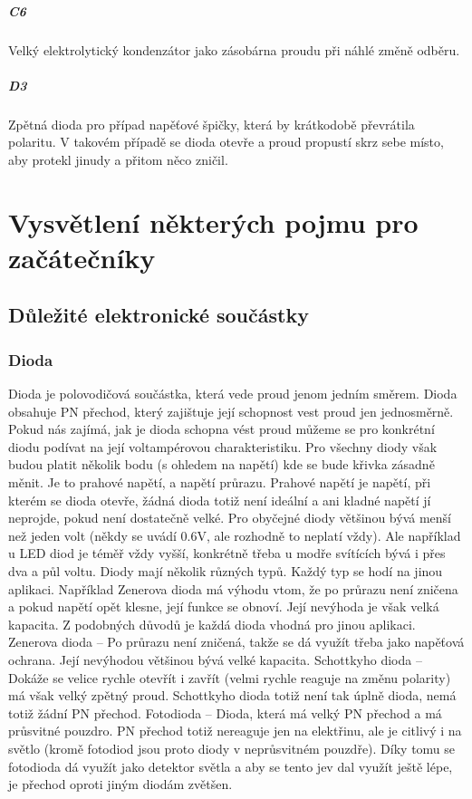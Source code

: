 \documentclass{template/socthesis}
\begin{document}
\begin{itemize}
	\subsubsection*{C6}
	Velký elektrolytický kondenzátor jako zásobárna proudu při náhlé změně odběru.
		
	\subsubsection*{D3}
	Zpětná dioda pro případ napěťové špičky, která by krátkodobě převrátila polaritu. V takovém případě se dioda otevře a proud propustí skrz sebe místo, aby protekl jinudy a přitom něco zničil.
	
	\end{itemize}


	\part*{Vysvětlení některých pojmu pro začátečníky}
	
	\chapter*{Důležité elektronické součástky}
	\section*{Dioda}
	Dioda je polovodičová součástka, která vede proud jenom jedním směrem. Dioda obsahuje PN přechod, který zajištuje její schopnost vest proud jen jednosměrně. Pokud nás zajímá, jak je dioda schopna vést proud můžeme se pro konkrétní diodu podívat na její voltampérovou charakteristiku. Pro všechny diody však budou platit několik bodu (s ohledem na napětí) kde se bude křivka zásadně měnit. Je to prahové napětí, a napětí průrazu. Prahové napětí je napětí, při kterém se dioda otevře, žádná dioda totiž není ideální a ani kladné napětí jí neprojde, pokud není dostatečně velké. Pro obyčejné diody většinou bývá menší než jeden volt (někdy se uvádí 0.6V, ale rozhodně to neplatí vždy). Ale například u LED diod je téměř vždy vyšší, konkrétně třeba u modře svítících bývá i přes dva a půl voltu.
	Diody mají několik různých typů. Každý typ se hodí na jinou aplikaci. Například Zenerova dioda má výhodu vtom, že po průrazu není zničena a pokud napětí opět klesne, její funkce se obnoví. Její nevýhoda je však velká kapacita. Z podobných důvodů je každá dioda vhodná pro jinou aplikaci.
	Zenerova dioda – Po průrazu není zničená, takže se dá využít třeba jako napěťová ochrana. Její nevýhodou většinou bývá velké kapacita.
	Schottkyho dioda – Dokáže se velice rychle otevřít i zavřít (velmi rychle reaguje na změnu polarity) má však velký zpětný proud. Schottkyho dioda totiž není tak úplně dioda, nemá totiž žádní PN přechod.
	Fotodioda – Dioda, která má velký PN přechod a má průsvitné pouzdro. PN přechod totiž nereaguje jen na elektřinu, ale je citlivý i na světlo (kromě fotodiod jsou proto diody v neprůsvitném pouzdře). Díky tomu se fotodioda dá využít jako detektor světla a aby se tento jev dal využít ještě lépe, 
	je přechod oproti jiným diodám zvětšen.
\end{document}
